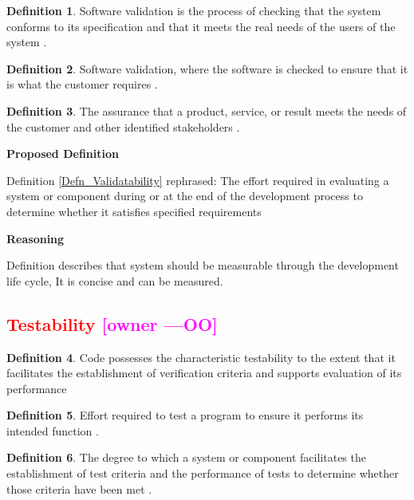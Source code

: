 \documentclass[letterpaper, cleveref]{lipics-v2019}
\newcommand{\authornote}[3]{\textcolor{#1}{[#3 ---#2]}}
\newcommand{\authornote}[3]{}
\newcommand{\oo}[1]{\authornote{magenta}{OO}{#1}} %
\newcommand{\notdone}[1]{\textcolor{red}{#1}}
\theoremstyle{definition}
\newtheorem{defn}{Definition}
\begin{document}
\begin{defn}
  Software validation is the process of checking that the system conforms to
  its specification and that it meets the real needs of the users of the
  system \citep{sommerville}. %
\end{defn}

\begin{defn}
	Software validation, where the software is checked to ensure that it is
  what the customer requires \citep{sommerville}. %
\end{defn}

\begin{defn}
  The assurance that a product, service, or result meets the needs of the
  customer and other identified stakeholders \citep{project2017guide}.
\end{defn}

\noindent \textbf{Proposed Definition}

Definition \ref{Defn_Validatability} rephrased:  The effort required in
evaluating a system or component during or at the end of the development
process to determine whether it satisfies specified requirements

\noindent \textbf{Reasoning}

Definition describes that system should be measurable through the
development life cycle, It is concise and can be measured.


\subsection{\notdone{Testability} \oo{owner}}

\begin{defn}
	Code possesses the characteristic testability to the extent that it
  facilitates the establishment of verification criteria and supports
  evaluation of its performance \citep{boehm1976quantitative}
\end{defn}

\begin{defn}
	Effort required to test a program to ensure it performs
	its intended function \citep{McCallEtAl1977}.
\end{defn}

\begin{defn} \label{Defn_Testability}
	 The degree to which a system or component facilitates the establishment of
	 test criteria and the performance of tests to determine whether those
	 criteria have been met \citep{IEEEStdGlossarySET1990}.
\end{defn}
\end{document}
